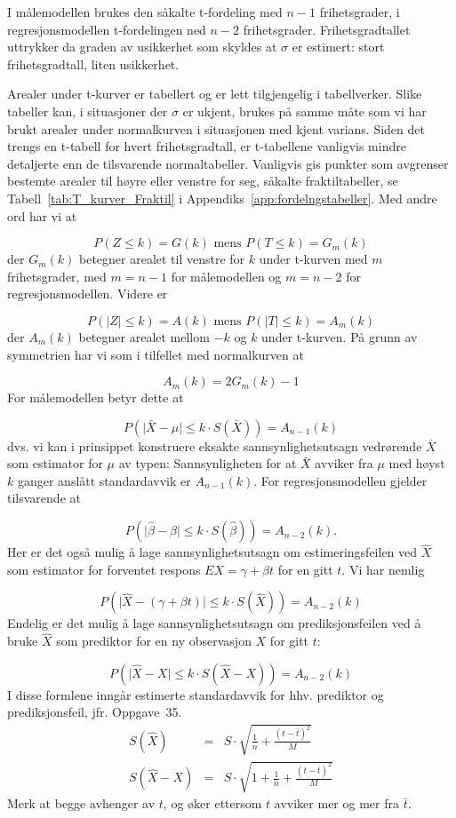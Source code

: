 I målemodellen brukes den såkalte t-fordeling med $n-1$
frihetsgrader, i regresjons\-modellen t-fordelingen ned $n-2$
frihetsgrader. Frihetsgradtallet uttrykker da graden av
usikkerhet som skyldes at $\sigma$ er estimert: stort
frihetsgradtall, liten usikkerhet.

Arealer under t-kurver er
tabellert og er lett tilgjengelig i tabellverker. Slike tabeller
kan, i situasjoner der $\sigma$ er ukjent, brukes på samme
måte som vi har brukt arealer under normalkurven i
situasjonen med kjent varians. Siden det trengs en t-tabell for
hvert frihetsgradtall, er t-tabellene vanligvis mindre detaljerte
enn de tilsvarende normaltabeller. Vanligvis gis punkter som
avgrenser bestemte arealer til høyre eller venstre for seg,
såkalte fraktiltabeller, se Tabell~\ref{tab:T_kurver_Fraktil} i Appendiks~\ref{app:fordelngstabeller}. 
Med andre ord har vi at

\[  P(Z\le k)=G(k) \mbox{\ \ \ mens\ \ \ } P(T\le k)=G_m(k)  \] 
der $G_m(k)$ betegner arealet til venstre for $k$ under t-kurven
med $m$ frihetsgrader, med $m=n-1$ for målemodellen og $m=n-2$
for regresjonsmodellen. Videre er

\[  P(\mid Z \mid \le k)=A(k) \mbox{\ \ \ mens\ \ \ }P(\mid T \mid \le k)=A_m(k)\]
der $A_m(k)$ betegner arealet mellom $-k$ og $k$ under t-kurven.
På grunn av symmetrien har vi som i tilfellet med normalkurven at 
                                 
\[     A_m(k)=2G_m(k)-1\]
For målemodellen betyr dette at

\[   P(\mid\bar X -\mu\mid \le k\cdot S(\bar X))=A_{n-1}(k)\]
dvs. vi kan i prinsippet konstruere eksakte sannsynlighetsutsagn
vedrørende $\bar X$ som estimator for $\mu$ av typen:
Sannsynligheten for at $\bar X$ avviker fra $\mu$ med høyst
$k$ ganger anslått standardavvik er $A_{n-1}(k)$. For
regresjons\-modellen gjelder tilsvarende at

\[ P(\mid\hat\beta -\beta\mid\le k\cdot S(\hat\beta))=A_{n-2}(k).\]
Her er det også mulig å lage sannsynlighetsutsagn om
estimeringsfeilen ved $\hat X$ som estimator for forventet
respons $EX=\gamma+\beta t$ for en gitt $t$. Vi har nemlig

\[ P(\mid\hat X -(\gamma +\beta t)\mid \le k\cdot S(\hat X))=A_{n-2}(k)\]
Endelig er det mulig å lage sannsynlighetsutsagn om prediksjonsfeilen ved 
å bruke $\hat X$ som prediktor for en ny observasjon $X$ for 
gitt $t$:

\[ P(\mid \hat X - X\mid \le k\cdot S(\hat X -X))=A_{n-2}(k)\]
I disse formlene inngår estimerte standardavvik for hhv. prediktor og
prediksjonsfeil, jfr. Oppgave~35.
\begin{eqnarray*}
 S(\hat{X})&=&S\cdot \sqrt{\frac{1}{n}+ \frac{(t-\bar t)^2}{M}} \\
 S(\hat{X}-X)&=&S\cdot \sqrt{1 + \frac{1}{n}+ \frac{(t-\bar t)^2}{M}}
\end{eqnarray*}
Merk at begge avhenger av $t$, og
øker ettersom $t$ avviker mer og mer fra $\bar t$.


